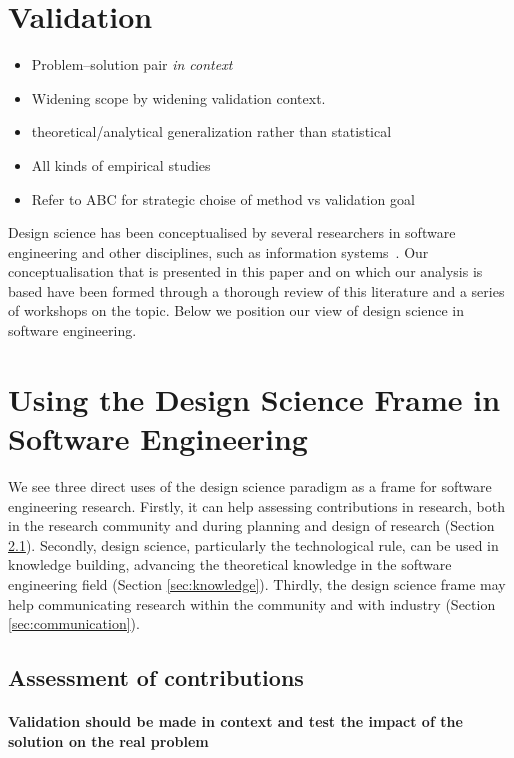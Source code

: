 \documentclass[graybox]{svmult}
\begin{document}
\section{Validation}
\begin{itemize}
\item Problem--solution pair \emph{in context}
\item Widening scope by widening validation context. 
\item theoretical/analytical generalization rather than statistical 
\item All kinds of empirical studies \cite{easterbrook_selecting_2008}\cite{Runeson12Case,WohlinExpBook12}
\item Refer to ABC \cite{StolABC18} for strategic choise of method vs validation goal
\end{itemize}



Design science has been conceptualised by several researchers in software engineering and other disciplines, such as information systems~\cite{gregor_positioning_2013}. Our conceptualisation that is presented in this paper and on which our analysis is based have been formed through a thorough review of this literature and a series of workshops on the topic. Below we position our view of design science in software engineering.



\section{Using the Design Science Frame in Software Engineering}
We see three direct uses of the design science paradigm as a frame for software engineering research. Firstly, it can help assessing contributions in research, both in the research community and during planning and design of research (Section \ref{sec:assessment}). Secondly, design science, particularly the technological rule, can be used in knowledge building, advancing the theoretical knowledge in the software engineering field (Section \ref{sec:knowledge}). Thirdly, the design science frame may help communicating research within the community and with industry (Section \ref{sec:communication}).

\subsection{Assessment of contributions}
\label{sec:assessment}
\paragraph{Validation should be made in context and test the impact of the solution on the real problem}
\end{document}
